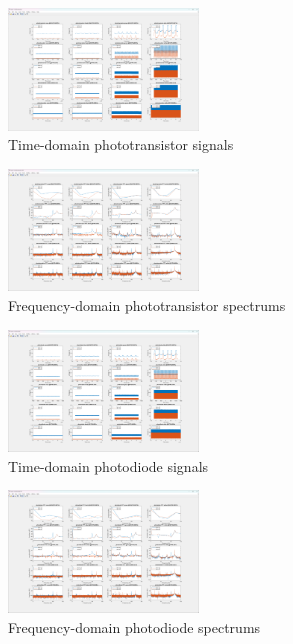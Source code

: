 \documentclass[conference]{IEEEtran}
\begin{document}
\begin{figure}[htbp]
	\centerline{\includegraphics[width=0.45\textwidth]{phototransistor-time.png}}
	\caption{Time-domain phototransistor signals}
	\label{fig:phototransistor-time}
\end{figure}
\begin{figure}[htbp]
	\centerline{\includegraphics[width=0.45\textwidth]{phototransistor-frequency.png}}
	\caption{Frequency-domain phototransistor spectrums}
	\label{fig:phototransistor-frequency}
\end{figure}
\begin{figure}[htbp]
	\centerline{\includegraphics[width=0.45\textwidth]{photodiode-time.png}}
	\caption{Time-domain photodiode signals}
	\label{fig:photodiode-time}
\end{figure}
\begin{figure}[htbp]
	\centerline{\includegraphics[width=0.45\textwidth]{photodiode-frequency.png}}
	\caption{Frequency-domain photodiode spectrums}
	\label{fig:photodiode-frequency}
\end{figure}
\end{document}

